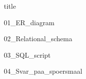 \documentclass{article}
\begin{document}
{title}

\frontmatter

\renewcommand{\contentsname}{Innhold}
\renewcommand{\listfigurename}{Figurer}
\renewcommand{\listtablename}{Tabeller}
\renewcommand{\figurename}{Figur}
\renewcommand{\tablename}{Tabell}

\tableofcontents
\listoffigures
\listoftables

\mainmatter

{01_ER_diagram}

{02_Relational_schema}

{03_SQL_script}

{04_Svar_paa_spoersmaal}

\newpage
\printbibliography[heading = bibintoc, title = Litteraturliste]
\end{document}
